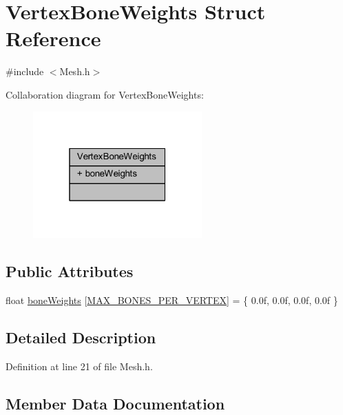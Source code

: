 \hypertarget{struct_vertex_bone_weights}{}\section{Vertex\+Bone\+Weights Struct Reference}
\label{struct_vertex_bone_weights}


{\ttfamily \#include $<$Mesh.\+h$>$}



Collaboration diagram for Vertex\+Bone\+Weights\+:\nopagebreak
\begin{figure}[H]
\begin{center}
\leavevmode
\includegraphics[width=184pt]{struct_vertex_bone_weights__coll__graph}
\end{center}
\end{figure}
\subsection*{Public Attributes}
\begin{DoxyCompactItemize}
\item 
float \hyperlink{struct_vertex_bone_weights_a88efd7130f4b024cdb15a79a2dfcddd6}{bone\+Weights} \mbox{[}\hyperlink{_mesh_8h_a590674a40eadbbd60bd8a3aefe485631}{M\+A\+X\+\_\+\+B\+O\+N\+E\+S\+\_\+\+P\+E\+R\+\_\+\+V\+E\+R\+T\+EX}\mbox{]} = \{ 0.\+0f, 0.\+0f, 0.\+0f, 0.\+0f \}
\end{DoxyCompactItemize}


\subsection{Detailed Description}


Definition at line 21 of file Mesh.\+h.



\subsection{Member Data Documentation}
